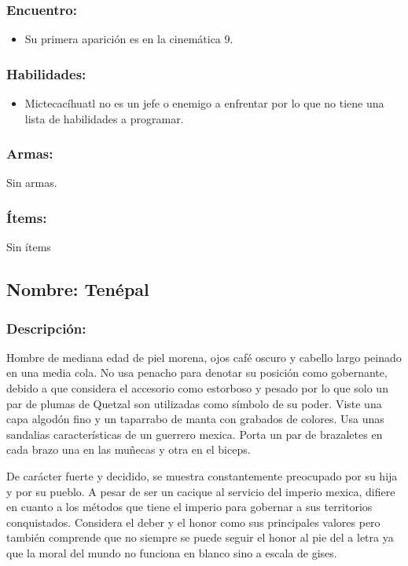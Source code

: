 \documentclass[11pt,letterpaper]{article}
\begin{document}
\subsubsection{Encuentro:}
\begin{itemize}
	\item Su primera aparición es en la cinemática 9.
\end{itemize} 

\subsubsection{Habilidades:}
\begin{itemize}
	\item Mictecacíhuatl no es un jefe o enemigo a enfrentar por lo que no tiene una lista de habilidades a programar.
\end{itemize}  
\subsubsection{Armas:}
Sin armas.
\subsubsection{Ítems:}
Sin ítems


\subsection{Nombre: Tenépal}  \label{per.tenepal}
\subsubsection{Descripción:}   
Hombre de mediana edad de piel morena, ojos café oscuro y cabello largo peinado en una media cola. No usa penacho para denotar su posición como gobernante, debido a que considera el accesorio como estorboso y pesado por lo que solo un par de plumas de Quetzal son utilizadas como símbolo de su poder. Viste una capa algodón fino y un taparrabo de manta con grabados de colores. Usa unas sandalias características de un guerrero mexica. Porta un par de brazaletes en cada brazo una en las muñecas y otra en el biceps.
\\
\par
De carácter fuerte y decidido, se muestra constantemente preocupado por su hija y por su pueblo. A pesar de ser un cacique al servicio del imperio mexica, difiere en cuanto a los métodos que tiene el imperio para gobernar a sus territorios conquistados. Considera el deber y el honor como sus principales valores pero también comprende que no siempre se puede seguir el honor al pie del a letra ya que la moral del mundo no funciona en blanco sino a escala de gises. 
\end{document}
